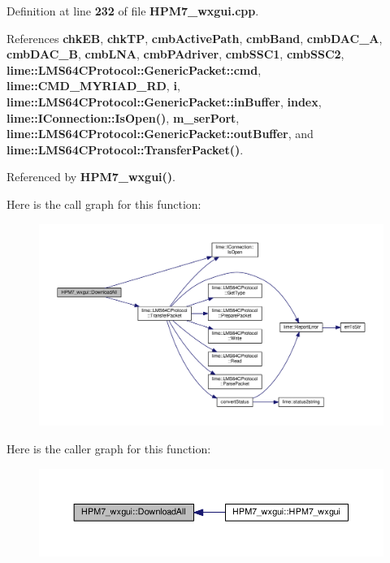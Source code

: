 Definition at line {\bf 232} of file {\bf H\+P\+M7\+\_\+wxgui.\+cpp}.



References {\bf chk\+EB}, {\bf chk\+TP}, {\bf cmb\+Active\+Path}, {\bf cmb\+Band}, {\bf cmb\+D\+A\+C\+\_\+A}, {\bf cmb\+D\+A\+C\+\_\+B}, {\bf cmb\+L\+NA}, {\bf cmb\+P\+Adriver}, {\bf cmb\+S\+S\+C1}, {\bf cmb\+S\+S\+C2}, {\bf lime\+::\+L\+M\+S64\+C\+Protocol\+::\+Generic\+Packet\+::cmd}, {\bf lime\+::\+C\+M\+D\+\_\+\+M\+Y\+R\+I\+A\+D\+\_\+\+RD}, {\bf i}, {\bf lime\+::\+L\+M\+S64\+C\+Protocol\+::\+Generic\+Packet\+::in\+Buffer}, {\bf index}, {\bf lime\+::\+I\+Connection\+::\+Is\+Open()}, {\bf m\+\_\+ser\+Port}, {\bf lime\+::\+L\+M\+S64\+C\+Protocol\+::\+Generic\+Packet\+::out\+Buffer}, and {\bf lime\+::\+L\+M\+S64\+C\+Protocol\+::\+Transfer\+Packet()}.



Referenced by {\bf H\+P\+M7\+\_\+wxgui()}.



Here is the call graph for this function\+:
\nopagebreak
\begin{figure}[H]
\begin{center}
\leavevmode
\includegraphics[width=350pt]{de/dd7/classHPM7__wxgui_a84f041158261c06f51675ebcbec523cd_cgraph}
\end{center}
\end{figure}




Here is the caller graph for this function\+:
\nopagebreak
\begin{figure}[H]
\begin{center}
\leavevmode
\includegraphics[width=350pt]{de/dd7/classHPM7__wxgui_a84f041158261c06f51675ebcbec523cd_icgraph}
\end{center}
\end{figure}


